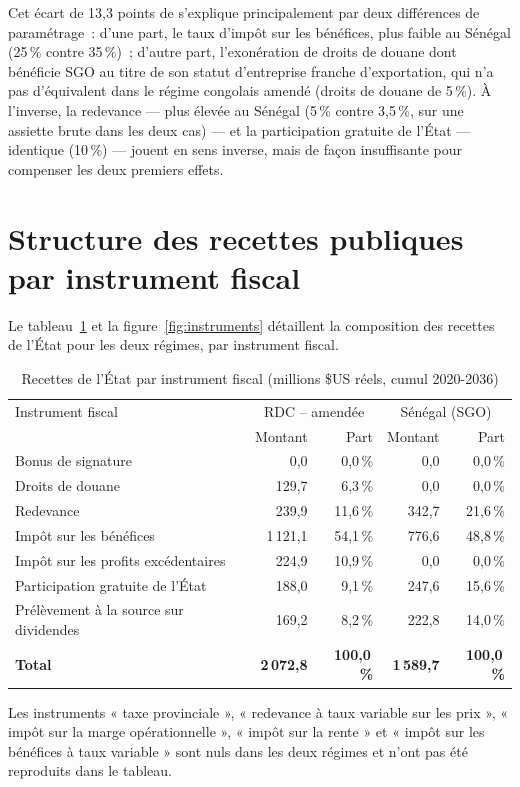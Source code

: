 Cet écart de 13,3 points de \TEMI{} s'explique principalement par deux différences de paramétrage~: d'une part, le taux d'impôt sur les bénéfices, plus faible au Sénégal (25\,\% contre 35\,\%)~; d'autre part, l'exonération de droits de douane dont bénéficie SGO au titre de son statut d'entreprise franche d'exportation, qui n'a pas d'équivalent dans le régime congolais amendé (droits de douane de 5\,\%). À l'inverse, la redevance --- plus élevée au Sénégal (5\,\% contre 3,5\,\%, sur une assiette brute dans les deux cas) --- et la participation gratuite de l'État --- identique (10\,\%) --- jouent en sens inverse, mais de façon insuffisante pour compenser les deux premiers effets.

\section{Structure des recettes publiques par instrument fiscal}

Le tableau~\ref{tab:instruments} et la figure~\ref{fig:instruments} détaillent la composition des recettes de l'État pour les deux régimes, par instrument fiscal.

\begin{table}[H]
\centering
\caption{Recettes de l'État par instrument fiscal (millions \$US réels, cumul 2020-2036)}
\label{tab:instruments}
\small
\begin{tabular}{lrrrr}
\toprule
Instrument fiscal & \multicolumn{2}{c}{RDC -- amendée} & \multicolumn{2}{c}{Sénégal (SGO)} \\
 & Montant & Part & Montant & Part \\
\midrule
Bonus de signature                       & 0,0     & 0,0\,\%  & 0,0     & 0,0\,\%  \\
Droits de douane                         & 129,7   & 6,3\,\%  & 0,0     & 0,0\,\%  \\
Redevance                                & 239,9   & 11,6\,\% & 342,7   & 21,6\,\% \\
Impôt sur les bénéfices                  & 1\,121,1 & 54,1\,\% & 776,6  & 48,8\,\% \\
Impôt sur les profits excédentaires      & 224,9   & 10,9\,\% & 0,0     & 0,0\,\%  \\
Participation gratuite de l'État         & 188,0   & 9,1\,\%  & 247,6   & 15,6\,\% \\
Prélèvement à la source sur dividendes   & 169,2   & 8,2\,\%  & 222,8   & 14,0\,\% \\
\midrule
\textbf{Total} & \textbf{2\,072,8} & \textbf{100,0\,\%} & \textbf{1\,589,7} & \textbf{100,0\,\%} \\
\bottomrule
\end{tabular}

\vspace{0.2cm}
\footnotesize Les instruments « taxe provinciale », « redevance à taux variable sur les prix », « impôt sur la marge opérationnelle », « impôt sur la rente » et « impôt sur les bénéfices à taux variable » sont nuls dans les deux régimes et n'ont pas été reproduits dans le tableau.
\end{table}

